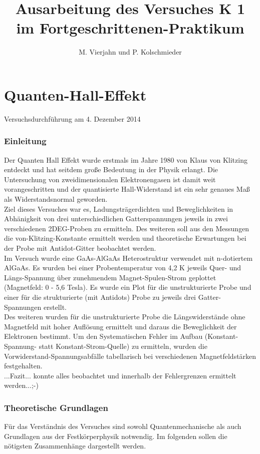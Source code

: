 \documentclass[10pt,a4paper]{article}
\author{M. Vierjahn und P. Kolschmieder}
\title{Ausarbeitung des Versuches K 1 im Fortgeschrittenen-Praktikum}
\begin{document}
\maketitle
\part*{Quanten-Hall-Effekt}
Versuchsdurchführung am 4. Dezember 2014\\
\section{Einleitung}
Der Quanten Hall Effekt wurde erstmals im Jahre 1980 von Klaus von Klitzing entdeckt und hat seitdem große Bedeutung in der Physik erlangt. Die Untersuchung von zweidimensionalen Elektronengasen ist damit weit vorangeschritten und der quantisierte Hall-Widerstand ist ein sehr genaues Maß als Widerstandsnormal geworden.\\
Ziel dieses Versuches war es, Ladungsträgerdichten und Beweglichkeiten in Abhänigkeit von drei unterschiedlichen Gatterspannungen jeweils in zwei verschiedenen 2DEG-Proben zu ermitteln. Des weiteren soll aus den Messungen die von-Klitzing-Konstante ermittelt werden und theoretische Erwartungen bei der Probe mit Antidot-Gitter beobachtet werden.\\ 
Im Versuch wurde eine GaAs-AlGaAs Heterostruktur verwendet mit n-dotiertem AlGaAs. Es wurden bei einer Probentemperatur von 4,2 K jeweils Quer- und Längs-Spannung über zunehmendem Magnet-Spulen-Strom geplottet (Magnetfeld: 0 - 5,6 Tesla). Es wurde ein Plot für die unstrukturierte Probe und einer für die strukturierte (mit Antidots) Probe zu jeweils drei Gatter-Spannungen erstellt. \\
Des weiteren wurden für die unstrukturierte Probe die Längswiderstände ohne Magnetfeld mit hoher Auflösung ermittelt und daraus die Beweglichkeit der Elektronen bestimmt. Um den Systematischen Fehler im Aufbau (Konstant-Spannung- statt Konstant-Strom-Quelle) zu ermitteln, wurden die Vorwiderstand-Spannungsabfälle tabellarisch bei verschiedenen Magnetfeldstärken festgehalten. \\
...Fazit... konnte alles beobachtet und innerhalb der Fehlergrenzen ermittelt werden...;-)
\section{Theoretische Grundlagen}
Für das Verständnis des Versuches sind sowohl Quantenmechanische als auch Grundlagen aus der Festkörperphysik notwendig. Im folgenden sollen die nötigsten Zusammenhänge dargestellt werden.
\end{document}
